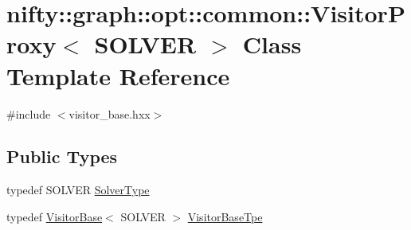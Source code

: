 \hypertarget{classnifty_1_1graph_1_1opt_1_1common_1_1VisitorProxy}{}\section{nifty\+:\+:graph\+:\+:opt\+:\+:common\+:\+:Visitor\+Proxy$<$ S\+O\+L\+V\+ER $>$ Class Template Reference}
\label{classnifty_1_1graph_1_1opt_1_1common_1_1VisitorProxy}


{\ttfamily \#include $<$visitor\+\_\+base.\+hxx$>$}

\subsection*{Public Types}
\begin{DoxyCompactItemize}
\item 
typedef S\+O\+L\+V\+ER \hyperlink{classnifty_1_1graph_1_1opt_1_1common_1_1VisitorProxy_adf9a1e3e32a8a5ed163501888a817eff}{Solver\+Type}
\item 
typedef \hyperlink{classnifty_1_1graph_1_1opt_1_1common_1_1VisitorBase}{Visitor\+Base}$<$ S\+O\+L\+V\+ER $>$ \hyperlink{classnifty_1_1graph_1_1opt_1_1common_1_1VisitorProxy_a6828e049755dc2f473d15558c488e33b}{Visitor\+Base\+Tpe}
\end{DoxyCompactItemize}
